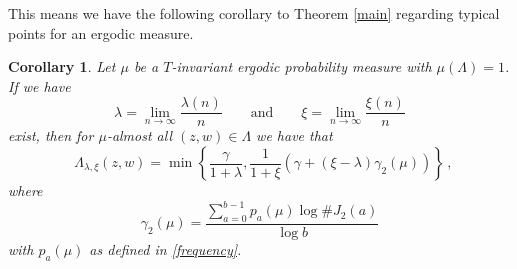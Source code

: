 \documentclass[12pt]{article}
\newtheorem{corollary}[definition]{Corollary}
\theoremstyle{remark}
\numberwithin{equation}{section}
\newcommand{\0}{\mathbf{0}}
\DeclareMathOperator{\dimh}{\dim_H}
\begin{document}
This means we have the following corollary to Theorem \ref{main} regarding typical points for an ergodic measure.

\begin{corollary}\label{corergodic}
Let $\mu$ be a $T$-invariant ergodic probability measure with $\mu(\Lambda)=1$. If we have \[\lambda=\lim_{n\to\infty}\frac{\lambda(n)}{n} \qquad \text{and} \qquad \xi=\lim_{n\to\infty}\frac{\xi(n)}{n}\] 
exist, then for $\mu$-almost all $(z,w)\in\Lambda$ we have that
\begin{equation*}
\dimh \Lambda_{\lambda,\xi}(z,w)=\min\left\{\frac{\gamma}{1+\lambda},\frac{1}{1+\xi}\left(\gamma+(\xi-\lambda)\gamma_2(\mu)\right)\right\} \, ,
\end{equation*} 
where
\[\gamma_2(\mu)=\frac{\sum_{a=0}^{b-1} p_a(\mu)\log \#J_2(a)}{\log b}\]
with $p_{a}(\mu)$ as defined in \eqref{frequency}.
\end{corollary}
\end{document}
